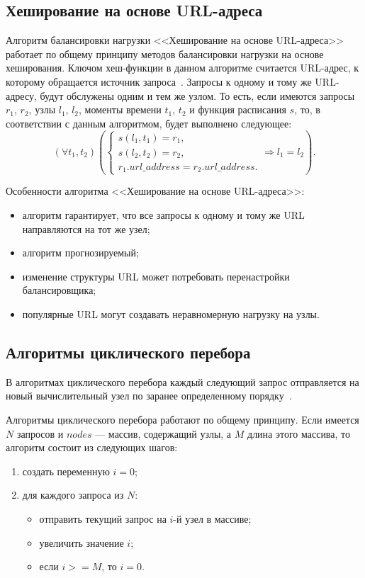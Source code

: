 \subsection*{Хеширование на основе URL-адреса}

Алгоритм балансировки нагрузки <<Хеширование на основе URL-адреса>> работает по общему принципу методов балансировки нагрузки на основе хеширования.
Ключом хеш-функции в данном алгоритме считается URL-адрес, к которому обращается источник запроса~\cite{nginx, kemp, haproxy}.
Запросы к одному и тому же URL-адресу, будут обслужены одним и тем же узлом.
То есть, если имеются запросы $r_1$, $r_2$, узлы $l_1$, $l_2$, моменты времени $t_1$, $t_2$ и функция расписания $s$, то, в соответствии с данным алгоритмом, будет выполнено следующее:
\begin{equation}
	(\forall t_1, t_2) \left(\begin{cases}
		s(l_1, t_1) = r_1, \\
		s(l_2, t_2) = r_2, \\
		r_1.url\_address = r_2.url\_address.
	\end{cases} \Rightarrow l_1 = l_2 \right).
\end{equation}

Особенности алгоритма <<Хеширование на основе URL-адреса>>:
\begin{itemize}
	\item алгоритм гарантирует, что все запросы к одному и тому же URL направляются на тот же узел;
	\item алгоритм прогнозируемый;
	\item изменение структуры URL может потребовать перенастройки балансировщика;
	\item популярные URL могут создавать неравномерную нагрузку на узлы.
\end{itemize}

\subsection{Алгоритмы циклического перебора}

В алгоритмах циклического перебора каждый следующий запрос отправляется на новый вычислительный узел по заранее определенному порядку~\cite{comp}.

Алгоритмы циклического перебора работают по общему принципу.
Если имеется $N$ запросов и $nodes$ --- массив, содержащий узлы, а $M$ длина этого массива, то алгоритм состоит из следующих шагов:
\begin{enumerate}
	\item создать переменную $i = 0$;
	\item для каждого запроса из $N$:
	\begin{itemize}
		\item отправить текущий запрос на $i$-й узел в массиве;
		\item увеличить значение $i$;
		\item если $i >= M$, то $i = 0$.
	\end{itemize}	
\end{enumerate}

